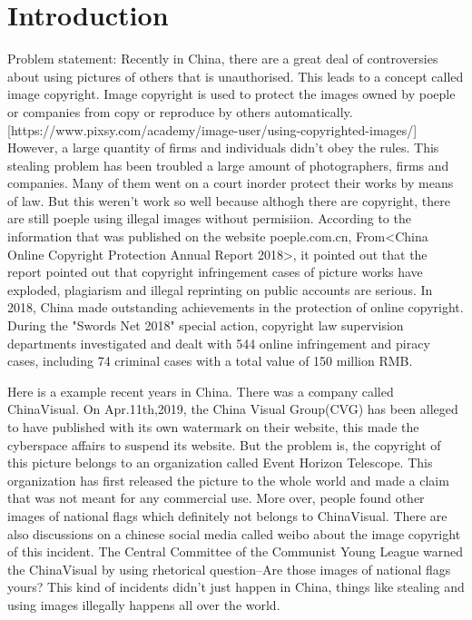 \section{Introduction}
Problem statement:
Recently in China, 
there are a great deal of controversies about using pictures of others that is unauthorised.
This leads to a concept called image copyright.
Image copyright is used to protect the images owned by poeple or companies from copy or reproduce by others automatically.[https://www.pixsy.com/academy/image-user/using-copyrighted-images/]
However, a large quantity of firms and individuals didn't obey the rules.
This stealing problem has been troubled a large amount of photographers, firms and companies.
Many of them went on a court inorder protect their works by means of law.
But this weren't work so well because althogh there are copyright, 
there are still poeple using illegal images  without permisiion.
According to the information that was published on the website poeple.com.cn,
From<China Online Copyright Protection Annual Report 2018>, 
it pointed out that the report pointed out that copyright infringement cases of picture works have exploded, 
plagiarism and illegal reprinting on public accounts are serious.
In 2018, China made outstanding achievements in the protection of online copyright. 
During the "Swords Net 2018" special action, copyright law supervision departments investigated and dealt with 544 online infringement and piracy cases, 
including 74 criminal cases with a total value of 150 million RMB.

Here is a example recent years in China.
There was a company called ChinaVisual.
On Apr.11th,2019, 
the China Visual Group(CVG) has been alleged to have published with its own watermark on their website, 
this made the cyberspace affairs to suspend its website.
But the problem is, the copyright of this picture belongs to an organization called Event Horizon Telescope. 
This organization has first released the picture to the whole world and made a claim that was not meant for any commercial use.
More over, people found other images of national flags which definitely not belongs to ChinaVisual.
There are also discussions on a chinese social media called weibo about the image copyright of this incident. 
The Central Committee of the Communist Young League warned the ChinaVisual by using rhetorical question--Are those images of national flags yours?
This kind of incidents didn't just happen in China, things like stealing and using images illegally happens all over the world.

